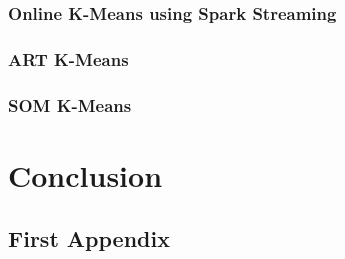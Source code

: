 \documentclass{l4proj}
\begin{document}
\subsection{Online K-Means using Spark Streaming}

\subsection{ART K-Means}

\subsection{SOM K-Means}



\chapter{Conclusion}
\label{conclusion}







\begin{appendices}

\chapter{First Appendix}

\end{appendices}
\end{document}
